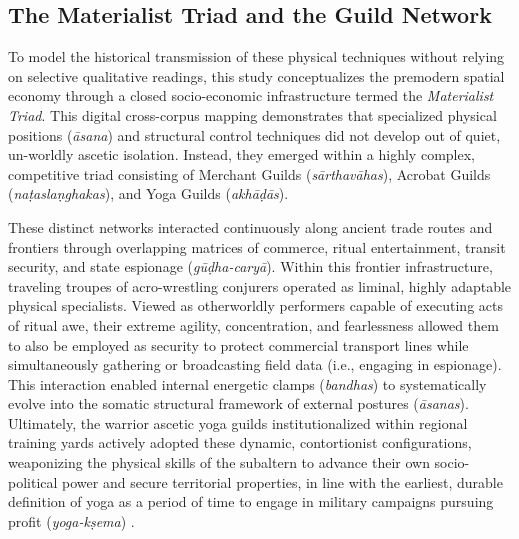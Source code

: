 \documentclass[11pt,twoside,letterpaper]{article}
\begin{document}
\subsection{The Materialist Triad and the Guild Network}
To model the historical transmission of these physical techniques without relying on selective qualitative readings, this study conceptualizes the premodern spatial economy through a closed socio-economic infrastructure termed the \textit{Materialist Triad}. This digital cross-corpus mapping demonstrates that specialized physical positions (\textit{āsana}) and structural control techniques did not develop out of quiet, un-worldly ascetic isolation. Instead, they emerged within a highly complex, competitive triad consisting of Merchant Guilds (\textit{sārthavāhas}), Acrobat Guilds (\textit{naṭas}\text{/}\textit{laṇghakas}), and Yoga Guilds (\textit{akhāḍās}).

These distinct networks interacted continuously along ancient trade routes and frontiers through overlapping matrices of commerce, ritual entertainment, transit security, and state espionage (\textit{gūḍha-caryā}). Within this frontier infrastructure, traveling troupes of acro-wrestling conjurers operated as liminal, highly adaptable physical specialists. Viewed as otherworldly performers capable of executing acts of ritual awe, their extreme agility, concentration, and fearlessness allowed them to also be employed as security to protect commercial transport lines while simultaneously gathering or broadcasting field data (i.e., engaging in espionage). This interaction enabled internal energetic clamps (\textit{bandhas}) to systematically evolve into the somatic structural framework of external postures (\textit{āsanas}). Ultimately, the warrior ascetic yoga guilds institutionalized within regional training yards actively adopted these dynamic, contortionist configurations, weaponizing the physical skills of the subaltern to advance their own socio-political power and secure territorial properties, in line with the earliest, durable definition of yoga as a period of time to engage in military campaigns pursuing profit (\textit{yoga-kṣema}) \citep{oberlies2024,gwilt2024}.
\end{document}
